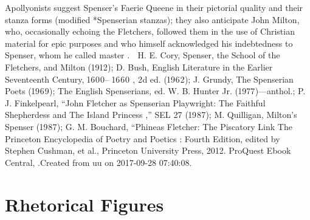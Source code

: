 Apollyonists suggest Spenser’s Faerie Queene in their pictorial quality and their stanza forms (modified *Spenserian stanzas); they also anticipate John Milton, who, occasionally echoing the Fletchers, followed them in the use of Christian material for epic purposes and who himself acknowledged his indebtedness to Spenser, whom he called master . ᭿ H. E. Cory, Spenser, the School of the Fletchers, and Milton (); D. Bush, English Literature in the Earlier Seventeenth Century, –  , d ed. (); J. Grundy, The Spenserian Poets (); The English Spenserians, ed. W. B. Hunter Jr. ()—anthol.; P. J. Finkelpearl, “John Fletcher as Spenserian Playwright: The Faithful Shepherdess and The Island Princess ,” SEL  (); M. Quilligan, Milton’s Spenser (); G. M. Bouchard, “Phineas Fletcher: The Piscatory Link The Princeton Encyclopedia of Poetry and Poetics : Fourth Edition, edited by Stephen Cushman, et al., Princeton University Press, 2012. ProQuest Ebook Central, .Created from uu on 2017-09-28 07:40:08. 
 
 
\section{Rhetorical Figures\label{secDef}}
